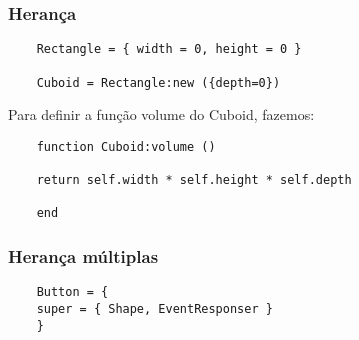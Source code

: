 \begin{frame}[fragile]
  \frametitle{Herança}
  \begin{block}{}
  \begin{lstlisting}
    Rectangle = { width = 0, height = 0 }

    Cuboid = Rectangle:new ({depth=0})
  \end{lstlisting}

   Para definir a função volume do Cuboid, fazemos:

  \begin{lstlisting}
    function Cuboid:volume ()

    return self.width * self.height * self.depth

    end
  \end{lstlisting}
  \end{block}
\end{frame}

\begin{frame}[fragile]
  \frametitle{Herança múltiplas}

  \begin{lstlisting}
    Button = {
    super = { Shape, EventResponser }
    }
  \end{lstlisting}
\end{frame}
